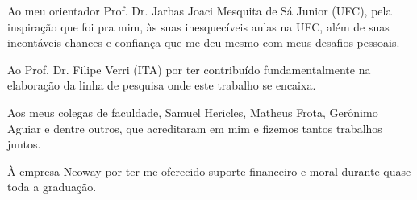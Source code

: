Ao meu orientador Prof. Dr. Jarbas Joaci Mesquita de Sá Junior (UFC), pela
inspiração que foi pra mim, às suas inesquecíveis aulas na UFC, além
de suas incontáveis chances e confiança que me deu mesmo com meus
desafios pessoais.

Ao Prof. Dr. Filipe Verri (ITA) por ter contribuído fundamentalmente
na elaboração da linha de pesquisa onde este trabalho se encaixa.

Aos meus colegas de faculdade, Samuel Hericles, Matheus Frota,
Gerônimo Aguiar e dentre outros, que acreditaram em mim e fizemos
tantos trabalhos juntos.

À empresa Neoway por ter me oferecido suporte financeiro e moral
durante quase toda a graduação.
